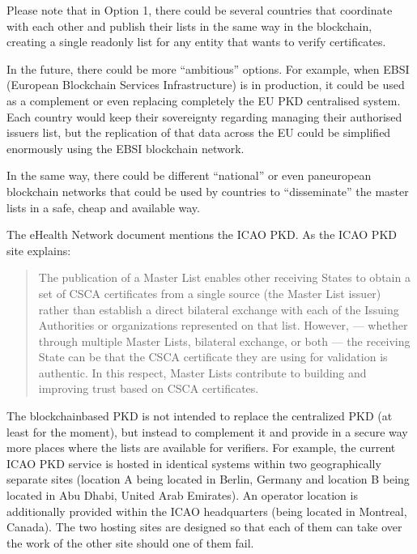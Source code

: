 \documentclass[a4paper,12pt,english]{sphinxhowto}
\begin{document}
\sphinxAtStartPar
Please note that in Option 1, there could be several countries that coordinate with each other and publish their lists in the same way in the blockchain, creating a single read\sphinxhyphen{}only list for any entity that wants to verify certificates.

\sphinxAtStartPar
{}

\sphinxAtStartPar
In the future, there could be more “ambitious” options. For example, when EBSI (European Blockchain Services Infrastructure) is in production, it could be used as a complement or even replacing completely the EU PKD centralised system. Each country would keep their sovereignty regarding managing their authorised issuers list, but the replication of that data across the EU could be simplified enormously using the EBSI blockchain network.

\sphinxAtStartPar
In the same way, there could be different “national” or even pan\sphinxhyphen{}european blockchain networks that could be used by countries to “disseminate” the master lists in a safe, cheap and available way.

\sphinxAtStartPar
The eHealth Network document mentions the ICAO PKD. As the ICAO PKD site explains:
\begin{quote}

\sphinxAtStartPar
The publication of a Master List enables other receiving States to obtain a set of CSCA certificates from a single source (the Master List issuer) rather than establish a direct bilateral exchange with each of the Issuing Authorities or organizations represented on that list. However,  — whether through multiple Master Lists, bilateral exchange, or both —  the receiving State can be that the CSCA certificate they are using for validation is authentic. In this respect, Master Lists contribute to building and improving trust based on CSCA certificates.
\end{quote}

\sphinxAtStartPar
The blockchain\sphinxhyphen{}based PKD is not intended to replace the centralized PKD (at least for the moment), but instead to complement it and provide in a secure way more places where the lists are available for verifiers.
For example, the current ICAO PKD service is hosted in identical systems within two geographically separate sites (location A being located in Berlin, Germany and location B being located in Abu Dhabi, United Arab Emirates). An operator location is additionally provided within the ICAO headquarters (being located in Montreal, Canada). The two hosting sites are designed so that each of them can take over the work of the other site should one of them fail.
\end{document}
